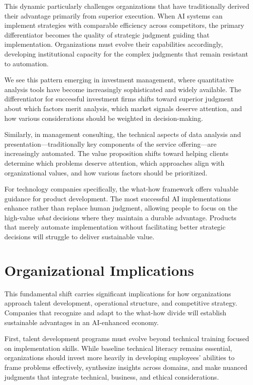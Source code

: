 \documentclass[
  Letterpaper,
]{scrbook}
\begin{document}
This dynamic particularly challenges organizations that have
traditionally derived their advantage primarily from superior execution.
When AI systems can implement strategies with comparable efficiency
across competitors, the primary differentiator becomes the quality of
strategic judgment guiding that implementation. Organizations must
evolve their capabilities accordingly, developing institutional capacity
for the complex judgments that remain resistant to automation.

We see this pattern emerging in investment management, where
quantitative analysis tools have become increasingly sophisticated and
widely available. The differentiator for successful investment firms
shifts toward superior judgment about which factors merit analysis,
which market signals deserve attention, and how various considerations
should be weighted in decision-making.

Similarly, in management consulting, the technical aspects of data
analysis and presentation---traditionally key components of the service
offering---are increasingly automated. The value proposition shifts
toward helping clients determine which problems deserve attention, which
approaches align with organizational values, and how various factors
should be prioritized.

For technology companies specifically, the what-how framework offers
valuable guidance for product development. The most successful AI
implementations enhance rather than replace human judgment, allowing
people to focus on the high-value \emph{what} decisions where they
maintain a durable advantage. Products that merely automate
implementation without facilitating better strategic decisions will
struggle to deliver sustainable value.

\section{Organizational Implications}\label{organizational-implications}

This fundamental shift carries significant implications for how
organizations approach talent development, operational structure, and
competitive strategy. Companies that recognize and adapt to the what-how
divide will establish sustainable advantages in an AI-enhanced economy.

First, talent development programs must evolve beyond technical training
focused on implementation skills. While baseline technical literacy
remains essential, organizations should invest more heavily in
developing employees' abilities to frame problems effectively,
synthesize insights across domains, and make nuanced judgments that
integrate technical, business, and ethical considerations.
\end{document}
